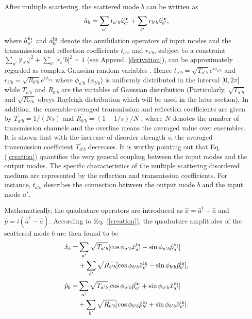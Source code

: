 \documentclass[9pt,twocolumn,twoside]{osajnl}
\begin{document}
After multiple scattering, the scattered mode $b$ can be written as
\begin{align}
\hat{a}_{b} = \sum_{a'}{t_{a'b}  \hat{a}_{a'}^{\rm{in}}} + \sum_{b'}{r_{b'b}  \hat{a}_{b'}^{\rm{in}}},
\label{creation}
\end{align}
where $\hat{a}^{\rm{in}}_{a'}$ and $\hat{a}^{\rm{in}}_{b'}$ denote the annihilation operators of input modes and the transmission and reflection coefficients $t_{a' b}$ and $r_{b'b}$, subject to a constraint $\sum_{a'} |t_{a'b}|^2 + \sum_{b'} |r_b'b|^2 = 1$ (see Append. \ref{derivation}), can be approximately regarded as complex Gaussian random variables \cite{beenakker1997,rossum1999,goodman2015}. Hence $t_{a'b} = \sqrt{T_{a'b}} e^{i\phi_{a'b}}$ and $r_{b'b} = \sqrt{R_{b'b}} e^{i\phi_{b'b}}$ where $\phi_{a'b}$ ($\phi_{b'b}$) is uniformly distributed in the interval [$0,2\pi$] while $T_{a'b}$ and $R_{b'b}$ are the variables of Gaussian distribution (Particularly, $\sqrt{T_{a'b}}$ and $\sqrt{R_{b'b}}$ obeys Rayleigh distribution \cite{goodman2015} which will be used in the later section). In addition, the ensemble-averaged transmission and reflection coefficients are given by $\overline{T_{a'b}} = 1/(Ns)$ and $\overline{R_{b'b}} = (1-1/s)/N$ \cite{rossum1999,lodahl2006b}, where $N$ denotes the number of transmission channels and the overline means the averaged value over ensembles. It is shown that with the increase of disorder strength $s$, the averaged transmission coefficient $\overline{{T_{a'b}}}$ decreases. It is worthy pointing out that Eq. (\ref{creation}) quantifies the very general coupling between the input modes and the output modes. The specific characteristics of the multiple scattering disordered medium are represented by the reflection and transmission coefficients. For instance, $t_{a'b}$ describes the connection between the output mode $b$ and the input mode $a'$. 

Mathematically, the quadrature operators are introduced as $\hat{x} = \hat{a}^{\dagger} + \hat{a}$ and $\hat{p} = i(\hat{a}^\dagger - \hat{a})$. According to Eq. (\ref{creation}), the quadrature amplitudes of the scattered mode $b$ are then found to be 
\begin{align}
\label{x0}
\hat{x}_b =& \sum_{a'}{\sqrt{T_{a'b}} [\cos \phi_{a'b} \hat{x}_{a'}^{\rm{in}} - \sin \phi_{a' b} \hat{p}_{a'}^{\rm{in}}]} \\ \nonumber
&+ \sum_{b'}{\sqrt{R_{b'b}} [\cos \phi_{b'b} \hat{x}_{b'}^{\rm{in}} - \sin \phi_{b'b} \hat{p}_{b'}^{\rm{in}}] },
\end{align}
\begin{align}
\hat{p}_b =& \sum_{a'}{\sqrt{T_{a'b}} [\cos \phi_{a'b} \hat{p}_{a'}^{\rm{in}}+ \sin \phi_{a' b} \hat{x}_{a'}^{\rm{in}}]}  \\ \nonumber
&+ \sum_{b'}{\sqrt{R_{b'b}} [\cos \phi_{b'b} \hat{p}_{b'}^{\rm{in}} + \sin \phi_{b'b} \hat{x}_{b'}^{\rm{in}}] }.
\end{align}
\end{document}
